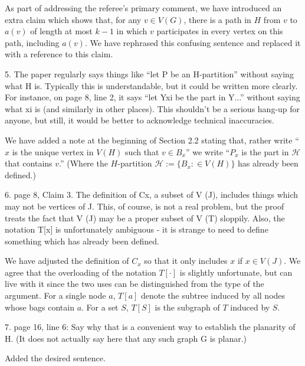 \documentclass[12pt]{article}
\newenvironment{response}{\color{blue}}{}
\begin{document}
\begin{response}
  As part of addressing the referee's primary comment, we have introduced an extra claim which shows that, for any $v\in V(G)$, there is a path in $H$ from $v$ to $a(v)$ of length at most $k-1$ in which $v$ participates in every vertex on this path, including $a(v)$.  We have rephrased this confusing sentence and replaced it with a reference to this claim.
\end{response}


5. The paper regularly says things like “let P be an H-partition” without
saying what H is. Typically this is understandable, but it could be
written more clearly. For instance, on page 8, line 2, it says “let Yxi
be the part in Y...” without saying what xi
is (and similarly in other
places). This shouldn’t be a serious hang-up for anyone, but still, it
would be better to acknowledge technical inaccuracies.

\begin{response}
  We have added a note at the beginning of Section 2.2 stating that, rather write ``$x$ is the unique vertex in $V(H)$ such that $v\in B_x$'' we write
  ``$P_x$ is the part in $\mathcal{H}$ that contains $v$.''  (Where the $H$-partition $\mathcal{H}:=\{B_x:\in V(H)\}$ has already been defined.)
\end{response}

6. page 8, Claim 3. The definition of Cx, a subset of V (J), includes things
which may not be vertices of J. This, of course, is not a real problem,
but the proof treats the fact that V (J) may be a proper subset of
V (T) sloppily. Also, the notation T[x] is unfortunately ambiguous - it
is strange to need to define something which has already been defined.

\begin{response}
  We have adjusted the definition of $C_x$ so that it only includes $x$ if $x\in V(J)$.  We agree that the overloading of the notation $T[\cdot]$ is slightly unfortunate, but can live with it since the two uses can be distinguished from the type of the argument.  For a single node $a$, $T[a]$ denote the subtree induced by all nodes whose bags contain $a$. For a set $S$, $T[S]$ is the subgraph of $T$ induced by $S$.
\end{response}

7. page 16, line 6: Say why that is a convenient way to establish the
planarity of H. (It does not actually say here that any such graph G
is planar.)

\begin{response}
	Added the desired sentence.
\end{response}
\end{document}
